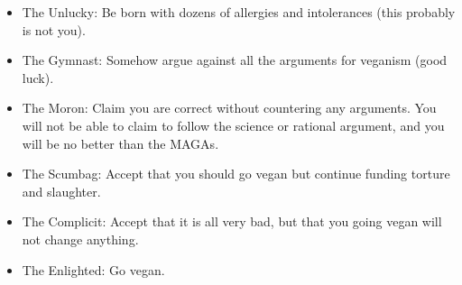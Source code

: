 \begin{itemize}
	\item The Unlucky: Be born with dozens of allergies and intolerances (this probably is not you).
	\item The Gymnast: Somehow argue against all the arguments for veganism (good luck).
	\item The Moron: Claim you are correct without countering any arguments. You will not be able to claim to follow the science or rational argument, and you will be no better than the MAGAs.
	\item The Scumbag: Accept that you should go vegan but continue funding torture and slaughter.
	\item The Complicit: Accept that it is all very bad, but that you going vegan will not change anything.
	\item The Enlighted: Go vegan.
\end{itemize}